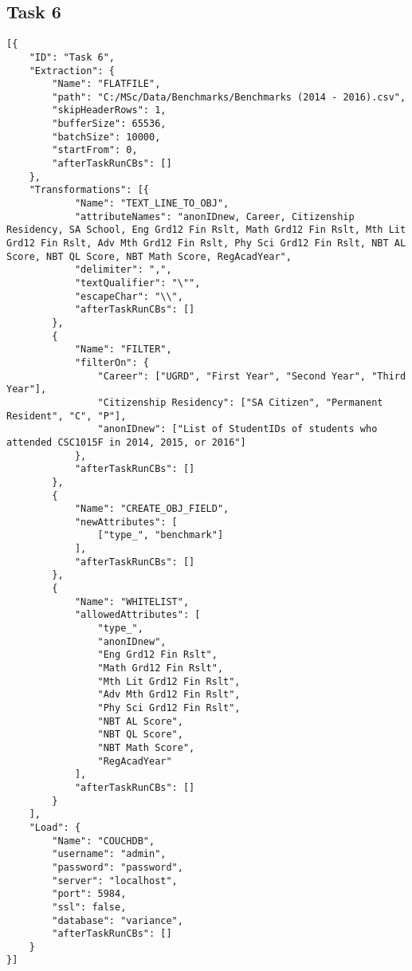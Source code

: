 \subsection{Task 6}
\label{netl-task-6-config}
\begin{verbatim}
[{
    "ID": "Task 6",
    "Extraction": {
        "Name": "FLATFILE",
        "path": "C:/MSc/Data/Benchmarks/Benchmarks (2014 - 2016).csv",
        "skipHeaderRows": 1,
        "bufferSize": 65536,
        "batchSize": 10000,
        "startFrom": 0,
        "afterTaskRunCBs": []
    },
    "Transformations": [{
            "Name": "TEXT_LINE_TO_OBJ",
            "attributeNames": "anonIDnew, Career, Citizenship Residency, SA School, Eng Grd12 Fin Rslt, Math Grd12 Fin Rslt, Mth Lit Grd12 Fin Rslt, Adv Mth Grd12 Fin Rslt, Phy Sci Grd12 Fin Rslt, NBT AL Score, NBT QL Score, NBT Math Score, RegAcadYear",
            "delimiter": ",",
            "textQualifier": "\"",
            "escapeChar": "\\",
            "afterTaskRunCBs": []
        },
        {
            "Name": "FILTER",
            "filterOn": {
                "Career": ["UGRD", "First Year", "Second Year", "Third Year"],
                "Citizenship Residency": ["SA Citizen", "Permanent Resident", "C", "P"],
                "anonIDnew": ["List of StudentIDs of students who attended CSC1015F in 2014, 2015, or 2016"]
            },
            "afterTaskRunCBs": []
        },
        {
            "Name": "CREATE_OBJ_FIELD",
            "newAttributes": [
                ["type_", "benchmark"]
            ],
            "afterTaskRunCBs": []
        },
        {
            "Name": "WHITELIST",
            "allowedAttributes": [
                "type_",
                "anonIDnew",
                "Eng Grd12 Fin Rslt",
                "Math Grd12 Fin Rslt",
                "Mth Lit Grd12 Fin Rslt",
                "Adv Mth Grd12 Fin Rslt",
                "Phy Sci Grd12 Fin Rslt",
                "NBT AL Score",
                "NBT QL Score",
                "NBT Math Score",
                "RegAcadYear"
            ],
            "afterTaskRunCBs": []
        }
    ],
    "Load": {
        "Name": "COUCHDB",
        "username": "admin",
        "password": "password",
        "server": "localhost",
        "port": 5984,
        "ssl": false,
        "database": "variance",
        "afterTaskRunCBs": []
    }
}]
\end{verbatim}